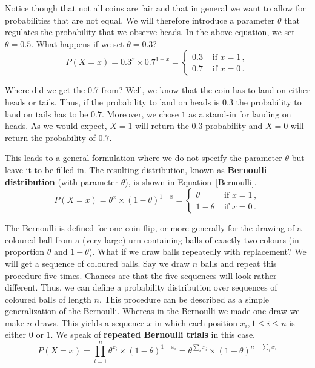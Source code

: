 Notice though that not all coins are fair and that in general we want to allow for probabilities that are not equal. 
We will therefore introduce a parameter $ \theta $ that regulates the probability that we observe heads. In the
above equation, we set $ \theta = 0.5 $. What happens if we set $ \theta = 0.3 $?
\begin{equation}
P(X=x) = 0.3^{x} \times 0.7^{1-x} = 
\begin{cases}
0.3 & \mbox{ if $x=1$} \, , \\
0.7 & \mbox{ if $x=0$} \, .
\end{cases}
\end{equation}

Where did we get the 0.7 from? Well, we know that the coin has to land on either heads or tails. Thus, if the probability
to land on heads is $ 0.3 $ the probability to land on tails has to be $ 0.7 $. Moreover, we chose $ 1 $ as a stand-in for
landing on heads. As we would expect, $ X = 1 $ will return the $ 0.3 $ probability and $ X = 0 $ will return the probability of $ 0.7 $.

This leads to a general formulation where we do not specify the parameter $ \theta $ but leave it to be filled in. 
The resulting distribution, known as \textbf{Bernoulli distribution} (with parameter $ \theta $), is shown in Equation~\eqref{Bernoulli}.
\begin{equation}\label{Bernoulli}
P(X=x) = \theta^{x} \times (1 - \theta)^{1-x} =
\begin{cases}
\theta & \mbox{ if $x=1$} \, , \\
1-\theta & \mbox{ if $x=0$} \, .
\end{cases}
\end{equation}

The Bernoulli is defined for one coin flip, or more generally for the
drawing of a coloured ball from a (very large) urn containing balls
of exactly two colours (in proportion $\theta$ and $1-\theta$). What if we draw balls repeatedly with replacement? We will get a sequence of coloured balls. 
Say we draw $ n $ balls and repeat this procedure five times. Chances are that the five sequences will look rather different.
Thus, we can define a probability distribution over sequences of
coloured balls of length $ n $. This procedure can be described as a simple generalization
of the Bernoulli. Whereas in the Bernoulli we made one draw we make $
n $ draws. This yields a sequence $ x $ in which each position $ x_{i}, 1 \leq i \leq n $ is either $ 0 $ or $ 1 $.
We speak of \textbf{repeated Bernoulli trials} in this case.
\begin{equation}\label{Multinoulli}
P(X=x) = \prod_{i=1}^{n} \theta^{x_{i}} \times (1 - \theta)^{1-x_{i}} = \theta^{\sum_i x_i} \times (1 - \theta)^{n-\sum_i x_i}
\end{equation}

